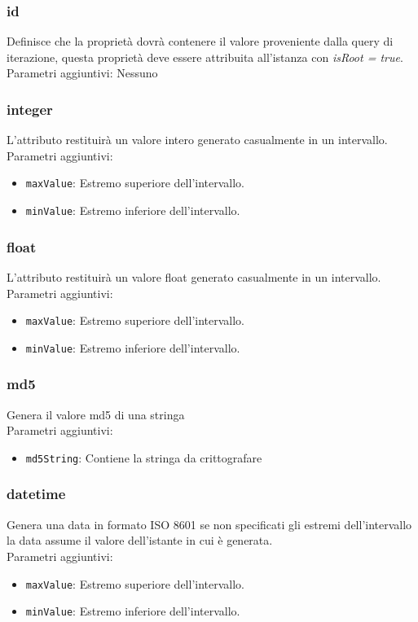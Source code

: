 \documentclass[12pt,a4paper,italian]{article}
\begin{document}
\subsubsection{\large{id}}  Definisce che la proprietà dovrà contenere il valore proveniente dalla query di iterazione, 
questa proprietà deve essere attribuita all'istanza con \emph{isRoot = true}.\\
Parametri aggiuntivi: Nessuno
\subsubsection{\large{integer}} L'attributo restituirà un valore intero generato casualmente in un intervallo.\\
Parametri aggiuntivi:
\begin{itemize}
	\item \texttt{maxValue}: Estremo superiore dell'intervallo.
	\item \texttt{minValue}: Estremo inferiore dell'intervallo.
\end{itemize}
\subsubsection{\large{float}} L'attributo restituirà un valore float generato casualmente in un intervallo.\\
Parametri aggiuntivi:
\begin{itemize}
	\item \texttt{maxValue}: Estremo superiore dell'intervallo.
	\item \texttt{minValue}: Estremo inferiore dell'intervallo.
\end{itemize}
\subsubsection{\large{md5}} Genera il valore md5 di una stringa\\
Parametri aggiuntivi:
\begin{itemize}
	\item \texttt{md5String}: Contiene la stringa da crittografare
\end{itemize}
\subsubsection{\large{datetime}} Genera una data in formato ISO 8601 se non specificati gli estremi dell'intervallo la data assume il valore dell'istante in cui è generata.\\
Parametri aggiuntivi:
\begin{itemize}
	\item \texttt{maxValue}: Estremo superiore dell'intervallo.
	\item \texttt{minValue}: Estremo inferiore dell'intervallo.
\end{itemize}
\end{document}
